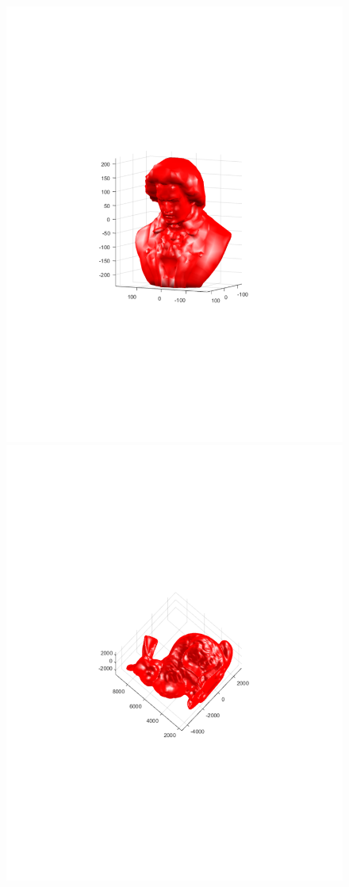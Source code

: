 \documentclass{UCF_ETD}
\begin{document}
\begin{figure}[H] 
\begin{center}
\includegraphics[scale=0.4]{RobustRegistration/BeethhovanBust}
\includegraphics[scale=0.4]{RobustRegistration/Bunny}

\end{center}
\end{figure}
\end{document}
